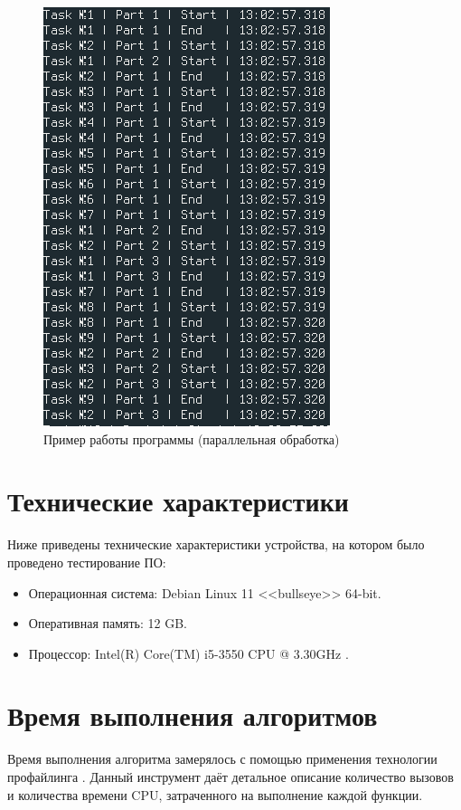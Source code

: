 \documentclass[12pt]{report}
\begin{document}
\begin{figure}[h]
	\centering
	\includegraphics[scale=0.8]{prog_ex.png}
	\caption{Пример работы программы (параллельная обработка)}
	\label{fig:conveyor}
\end{figure}

\section{Технические характеристики}

Ниже приведены технические характеристики устройства, на котором было проведено тестирование ПО:

\begin{itemize}
	\item Операционная система: Debian \cite{debian} Linux \cite{linux} 11 <<bullseye>> 64-bit.
	\item Оперативная память: 12 GB.
	\item Процессор: Intel(R) Core(TM) i5-3550 CPU @ 3.30GHz
\cite{i5}.

\end{itemize}

\section{Время выполнения алгоритмов}

Время выполнения алгоритма замерялось с помощью применения технологии профайлинга \cite{profiling}. Данный инструмент даёт детальное описание количество вызовов и количества времени CPU, затраченного на выполнение каждой функции.
\end{document}
